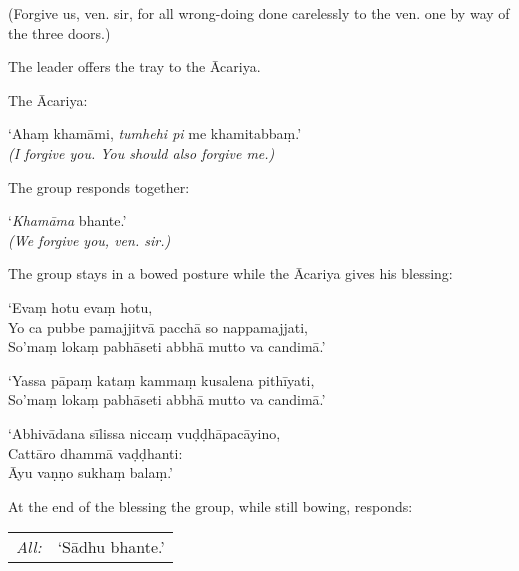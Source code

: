 \begin{english}
  (Forgive us, ven. sir, for all wrong-doing done carelessly to the ven. one by way of the three doors.)
\end{english}

The leader offers the tray to the Ācariya.

The Ācariya:

\vspace*{\parskip}

\begin{paritta}
  ‘Ahaṃ khamāmi, \emph{tumhehi pi} me khamitabbaṃ.’\\
  \emph{(I forgive you. You should also forgive me.)}
\end{paritta}

The group responds together:

\vspace*{\parskip}

\begin{paritta}
  ‘\emph{Khamāma} bhante.’\\
  \emph{(We forgive you, ven. sir.)}
\end{paritta}

The group stays in a bowed posture while the Ācariya gives his blessing:

\vspace*{\parskip}

\begin{paritta}
  ‘Evaṃ hotu evaṃ hotu,\\
  Yo ca pubbe pamajjitvā pacchā so nappamajjati,\\
  So'maṃ lokaṃ pabhāseti abbhā mutto va candimā.’

  ‘Yassa pāpaṃ kataṃ kammaṃ kusalena pithīyati,\\
  So'maṃ lokaṃ pabhāseti abbhā mutto va candimā.’

  ‘Abhivādana sīlissa niccaṃ vuḍḍhāpacāyino,\\
  Cattāro dhammā vaḍḍhanti:\\
  Āyu vaṇṇo sukhaṃ balaṃ.’

\end{paritta}

At the end of the blessing the group, while still bowing, responds:

\begin{tabular}{@{}L{3em}L{10em}@{}}
\hspace*{1.5em}\emph{All:} & ‘Sādhu bhante.’\\
\end{tabular}

